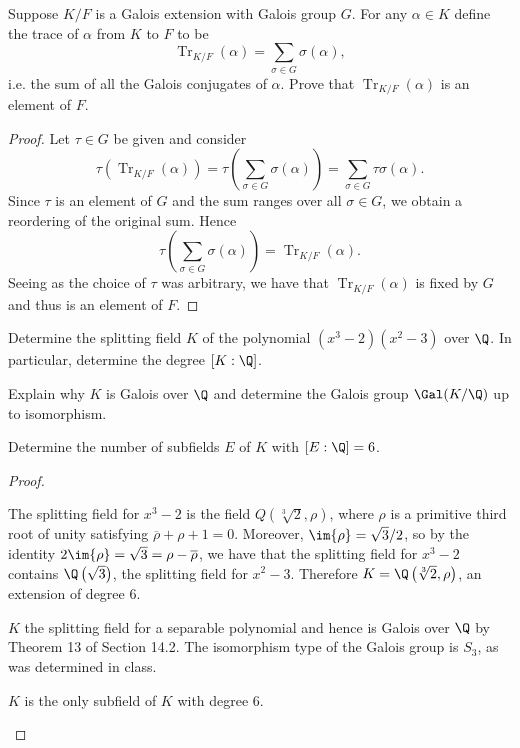 \documentclass[10pt]{amsart}
\begin{document}
\begin{thm}
  \label{Ex6}
  \newcommand{\Tr}{\operatorname{Tr}}
  Suppose $K/F$ is a Galois extension with Galois group $G$.
  For any $\alpha \in K$ define the trace of $\alpha$ from $K$ to $F$ to be $$\Tr_{K/F}(\alpha) = \sum_{\sigma \in G} \sigma(\alpha),$$
  i.e. the sum of all the Galois conjugates of $\alpha$.
  Prove that $\Tr_{K/F}(\alpha)$ is an element of $F$.
  
  \begin{proof}
    Let $\tau \in G$ be given and consider $$\tau(\Tr_{K/F}(\alpha)) = \tau\left(\sum_{\sigma \in G}\sigma(\alpha)\right) = \sum_{\sigma \in G} \tau\sigma(\alpha).$$
    Since $\tau$ is an element of $G$ and the sum ranges over all $\sigma \in G$, we obtain a reordering of the original sum.
    Hence $$\tau\left(\sum_{\sigma\in G} \sigma(\alpha)\right) = \Tr_{K/F}(\alpha).$$
    Seeing as the choice of $\tau$ was arbitrary, we have that $\Tr_{K/F}(\alpha)$ is fixed by $G$ and thus is an element of $F$.
  \end{proof}
\end{thm}

\begin{thm}
  \label{Ex7}
  \begin{alphaenum}
  \item
    Determine the splitting field $K$ of the polynomial $(x^3 - 2)(x^2 - 3)$ over $\Q$.
    In particular, determine the degree $[K:\Q]$.
  \item
    Explain why $K$ is Galois over $\Q$ and determine the Galois group $\Gal(K/\Q)$ up to isomorphism.
  \item
    Determine the number of subfields $E$ of $K$ with $[E:\Q] = 6$.
  \end{alphaenum}

  \begin{proof}
    \begin{alphaenum}
    \item
      The splitting field for $x^3 - 2$ is the field $Q\left(\sqrt[3]{2},\rho\right)$, where $\rho$ is a primitive third root of unity satisfying $\overline{\rho} + \rho + 1 = 0$.
      Moreover, $\im{\rho} = \sqrt{3}/2$, so by the identity $2\im{\rho} = \sqrt{3} = \rho - \overline{\rho}$, we have that the splitting field for $x^3 - 2$ contains $\Q\left(\sqrt{3}\right)$, the splitting field for $x^2 - 3$.
      Therefore $K = \Q\left(\sqrt[3]{2},\rho\right)$, an extension of degree 6.
    \item
      $K$ the splitting field for a separable polynomial and hence is Galois over $\Q$ by Theorem 13 of Section 14.2.
      The isomorphism type of the Galois group is $S_3$, as was determined in class.
    \item
      $K$ is the only subfield of $K$ with degree 6.
    \end{alphaenum}
  \end{proof}
\end{thm}
\end{document}
